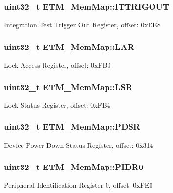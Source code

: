 \subsubsection[{I\+T\+T\+R\+I\+G\+O\+U\+T}]{\setlength{\rightskip}{0pt plus 5cm}uint32\+\_\+t E\+T\+M\+\_\+\+Mem\+Map\+::\+I\+T\+T\+R\+I\+G\+O\+U\+T}\label{struct_e_t_m___mem_map_a85a29fa5f53cb199fd980f61593d4c45}
Integration Test Trigger Out Register, offset\+: 0x\+E\+E8 \hypertarget{struct_e_t_m___mem_map_a3e7f9350f82e25fe0112095043733e96}{}
\subsubsection[{L\+A\+R}]{\setlength{\rightskip}{0pt plus 5cm}uint32\+\_\+t E\+T\+M\+\_\+\+Mem\+Map\+::\+L\+A\+R}\label{struct_e_t_m___mem_map_a3e7f9350f82e25fe0112095043733e96}
Lock Access Register, offset\+: 0x\+F\+B0 \hypertarget{struct_e_t_m___mem_map_a49d085205e5533bde644d064121739f2}{}
\subsubsection[{L\+S\+R}]{\setlength{\rightskip}{0pt plus 5cm}uint32\+\_\+t E\+T\+M\+\_\+\+Mem\+Map\+::\+L\+S\+R}\label{struct_e_t_m___mem_map_a49d085205e5533bde644d064121739f2}
Lock Status Register, offset\+: 0x\+F\+B4 \hypertarget{struct_e_t_m___mem_map_a9fa7ceaef6263bb4f389dd0b62517a9e}{}
\subsubsection[{P\+D\+S\+R}]{\setlength{\rightskip}{0pt plus 5cm}uint32\+\_\+t E\+T\+M\+\_\+\+Mem\+Map\+::\+P\+D\+S\+R}\label{struct_e_t_m___mem_map_a9fa7ceaef6263bb4f389dd0b62517a9e}
Device Power-\/\+Down Status Register, offset\+: 0x314 \hypertarget{struct_e_t_m___mem_map_a8e28324e300b4ce198839c4365ac2c19}{}
\subsubsection[{P\+I\+D\+R0}]{\setlength{\rightskip}{0pt plus 5cm}uint32\+\_\+t E\+T\+M\+\_\+\+Mem\+Map\+::\+P\+I\+D\+R0}\label{struct_e_t_m___mem_map_a8e28324e300b4ce198839c4365ac2c19}
Peripheral Identification Register 0, offset\+: 0x\+F\+E0 \hypertarget{struct_e_t_m___mem_map_a2b4d5fe9290dc96888a3c8361ff0b1cb}{}
